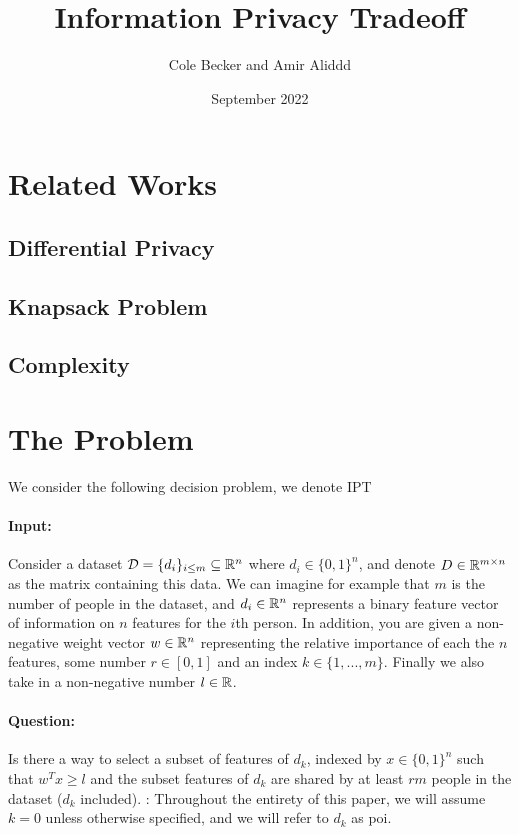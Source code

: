 \documentclass[12pt]{article}
\begin{document}
\title{Information Privacy Tradeoff}
\author{Cole Becker and Amir Aliddd}
\date{September 2022}
\maketitle

\section{Related Works}
\subsection{Differential Privacy}
\subsection{Knapsack Problem}
\subsection{Complexity}

\section{The Problem}
We consider the following decision problem, we denote \gls{IPT}
\paragraph{Input:}
Consider a dataset $\mathcal{D} = \{d_i\}_{i\leq m} \subseteq \mathbb{R}^n$ where $d_i \in \{0,1\}^n$, and denote $D\in \mathbb{R}^{m\times n}$ as the matrix containing this data. We can imagine for example that $m$ is the number of people in the dataset, and $d_i\in \mathbb{R}^n$ represents a binary feature vector of information on $n$ features for the $i$th person. In addition, you are given a non-negative weight vector $w\in \mathbb{R}^n$ representing the relative importance of each the $n$ features, some number $r \in [0,1]$ and an index $k \in \{1,...,m\}$. Finally we also take in a non-negative number $l \in \mathbb{R}$.
\paragraph{Question:}
Is there a way to select a subset of features of $d_k$, indexed by $x\in \{0,1\}^n$ such that $w^T x \geq l$ and the subset features of $d_k$ are shared by at least $rm$ people in the dataset ($d_k$ included). : Throughout the entirety of this paper, we will assume $k = 0$ unless otherwise specified, and we will refer to $d_k$ as \gls{poi}.
\end{document}
